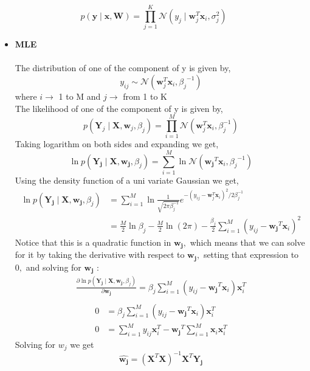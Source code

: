 \documentclass[english,a4paper,12pt]{article}
\begin{document}
\begin{enumerate}
$$p(\mathbf{y} \mid \mathbf{x}, \mathbf{W})=\prod_{j=1}^{K} \mathcal{N}\left(y_{j} \mid \mathbf{w}_{j}^{T} \mathbf{x}_{i}, \sigma_{j}^{2}\right)$$
    \begin{itemize}
        \item \textbf{MLE}\\~\\
        The distribution of one of the component of y is given by, 
$$
y_{ij} \sim \mathcal{N}\left(\mathbf{w}_{j}^{T} \mathbf{x}_{i}, {\beta_j}^{-1}\right)
$$
where $i \rightarrow$ 1 to M and $j \rightarrow$ from 1 to K\\
The likelihood of one of the component of y is given by,\\
$$
p(\mathbf{Y}_{j} \mid \mathbf{X}, \mathbf{w}_{j}, \beta_{j})=\prod_{i=1}^{M} \mathcal{N}\left(\mathbf{w}_{j}^{T} \mathbf{x}_{i}, \beta_{j}^{-1}\right)
$$
Taking logarithm on both sides and expanding we get,
$$
\ln p(\mathbf{Y_j} \mid \mathbf{X}, \mathbf{w_j}, \beta_{j})=\sum_{i=1}^{M} \ln \mathcal{N}\left(\mathbf{w_j}^{T} \mathbf{x}_{i}, {\beta_j}^{-1}\right)
$$
Using the density function of a uni variate Gaussian we get,
$$
\begin{aligned}
\ln p(\mathbf{{Y}_{j}} \mid \mathbf{X}, \mathbf{{w}_{j}}, \beta_{j}) &=\sum_{i=1}^{M} \ln \frac{1}{\sqrt{2 \pi \beta_{j}^{-1}}} e^{-\left(y_{ij}-\mathbf{w}_{j}^{T} \mathbf{x}_{i}\right)^{2} / 2 \beta_{j}^{-1}} \\
&=\frac{M}{2} \ln \beta_{j}-\frac{M}{2} \ln(2 \pi)-\frac{\beta_{j}}{2} \sum_{i=1}^{M}\left(y_{ij}-\mathbf{w_j}^{T} \mathbf{x}_{i}\right)^{2}
\end{aligned}
$$
Notice that this is a quadratic function in $\mathbf{w_j},$ which means that we can solve for it by taking the derivative with respect to $\mathbf{w_j},$ setting that expression to $0,$ and solving for $\mathbf{w_j}$ :
\newpage
$$
\begin{aligned}
\frac{\partial \ln p(\mathbf{Y_{j}} \mid \mathbf{X}, \mathbf{w_{j}}, \beta_{j})}{\partial \mathbf{w_{j}}}=\beta_{j} \sum_{i=1}^{M}\left(y_{ij}-\mathbf{w_{j}}^{T} \mathbf{x}_{i}\right) \mathbf{x}_{i}^{T}\\
\end{aligned}
$$
$$
\begin{aligned}
0&=\beta_{j} \sum_{i=1}^{M}\left(y_{ij}-\mathbf{w_{j}}^{T} \mathbf{x}_{i}\right) \mathbf{x}_{i}^{T}\\
0&=\sum_{i=1}^{M} {y_{ij}} \mathbf{x}_{i}^{T}-\mathbf{w_j}^{T} \sum_{i=1}^{M} \mathbf{x}_{i} \mathbf{x}_{i}^{T}
\end{aligned}
$$
Solving for $w_j$ we get
$$
{\hat{\mathbf{w_{j}}}}=\left(\mathbf{X}^{T} \mathbf{X}\right)^{-1} \mathbf{X}^{T} \mathbf{Y_j}
$$


\end{itemize}
\end{enumerate}
\end{document}

